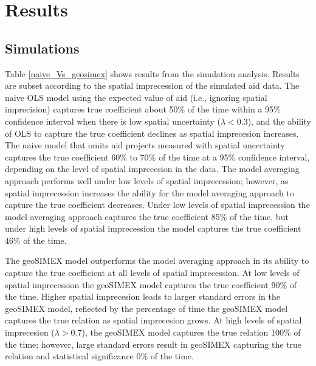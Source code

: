 \newpage

\section{Results}
\subsection{Simulations}

Table \ref{naive_Vs_geosimex} shows results from the simulation analysis. 
Results are subset according to the spatial imprecession of the simulated aid data. 
The naive OLS model using the expected value of aid (i.e., ignoring spatial imprecision) captures true coefficient about 50\% of the time within a 95\% confidence interval when there is low spatial uncertainty ($\lambda < 0.3$), and the ability of OLS to capture the true coefficient declines as spatial imprecesion increases. 
The naive model that omits aid projects measured with spatial uncertainty captures the true coefficient 60\% to 70\% of the time at a 95\% confidence interval, depending on the level of spatial imprecesion in the data. 
The model averaging approach performs well under low levels of spatial imprecession; however, as spatial imprecession increases the ability for the model averaging approach to capture the true coefficient decreases. 
Under low levels of spatial imprecession the model averaging approach captures the true coefficient 85\% of the time, but under high levels of spatial imprecession the model captures the true coefficient 46\% of the time. 
\par
The geoSIMEX model outperforms the model averaging approach in its ability to capture the true coefficient at all levels of spatial imprecession. 
At low levels of spatial imprecession the geoSIMEX model captures the true coefficient 90\% of the time. 
Higher spatial imprecesion leads to larger standard errors in the geoSIMEX model, reflected by the percentage of time the geoSIMEX model captures the true relation as spatial imprecesion grows. 
At high levels of spatial imprecesion ($\lambda > 0.7$), the geoSIMEX model captures the true relation 100\% of the time; however, large standard errors result in geoSIMEX capturing the true relation and statistical significance 0\% of the time.

